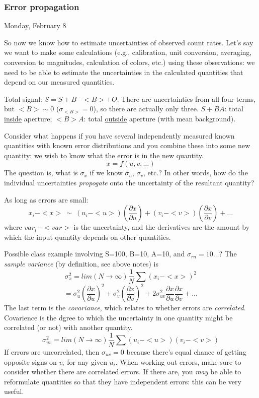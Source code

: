 \documentclass[12pt]{article}
\begin{document}
\textcolor{om}{\emph{}}

\subsubsection{Error propagation}
\textcolor{date}{Monday, February 8}

So now we know how to estimate uncertainties of observed count rates.
Let's say we want to make some calculations (e.g., calibration, unit
conversion, averaging, conversion to magnitudes, calculation of
colors, etc.) using these observations: we need to be able to estimate
the uncertainties in the calculated quantities that depend on our
measured quantities.

\textcolor{myBlue}{%
Total signal: $ S=S+B-<B>+O $. There are uncertainties from all
four terms, but $<B> \sim 0$ ($\sigma_{<B>}=0$), so there are
actually only three. $S+BA$: total \underline{inside} aperture;
$<B>A$: total \underline{outside} aperture (with mean background).}

Consider what happens if you have several independently measured
known quantities with known
error distributions and you combine these into some new quantity: we
wish to know what the error is in the new quantity.
    $$ x = f(u, v, \ldots) $$
The question is, what is $\sigma_x$ if we know
$\sigma_u$, $\sigma_v$, etc.?
\textcolor{myBlue}{In other words, how do the individual uncertainties
\emph{propogate} onto the uncertainty of the resultant quantity?}

As long as errors are small:
    $$ x_i - <x> \ \sim \
        (u_i - <u>)\left(\frac{\partial x}{\partial u}\right)
       + (v_i - <v>)\left( \frac{\partial x}{\partial v}  \right)
       + \ldots  $$
where $var_i - <var>$ is the uncertainty, and the derivatives are the
amount by which the input quantity depends on other quantities.

\textcolor{myBlue}{%
Possible class example involving
S=100, B=10, A=10, and $\sigma_{rn}=10\ldots$?
The \emph{sample variance} (by definition, see above notes) is}
    $$ \sigma_x^{2} = lim(N \rightarrow \infty)\frac{1}{N}
       \sum(x_i - <x>)^{2} $$
    $$ = \sigma_u^{2}\left(\frac{\partial x}{\partial u}\right)^{2}
       + \sigma_v^{2}\left(\frac{\partial x}{\partial v}\right)^{2}
       + 2\sigma_{uv}^{2}\frac{\partial x}{\partial u}
         \frac{\partial x}{\partial v} + \ldots $$
The last term is the \emph{covariance}, which relates to whether
errors are \emph{correlated}.
\textcolor{myBlue}{Covarience is the dgree to which the uncertainty
in one quantity might be correlated (or not) with another quantity}.
    $$ \sigma_{uv}^{2} = lim(N \rightarrow\infty)\frac{1}{N}
       \sum(u_i - <u>)(v_i - <v>)  $$
If errors are uncorrelated, then $\sigma_{uv} = 0$ because there's
equal chance of getting opposite signs on $v_i$ for any given $u_i$.
When working out errors, make sure to consider whether there are
correlated errors. If there are, you \emph{may} be able to reformulate
quantities so that they have independent errors: this can be very
useful.
\end{document}

